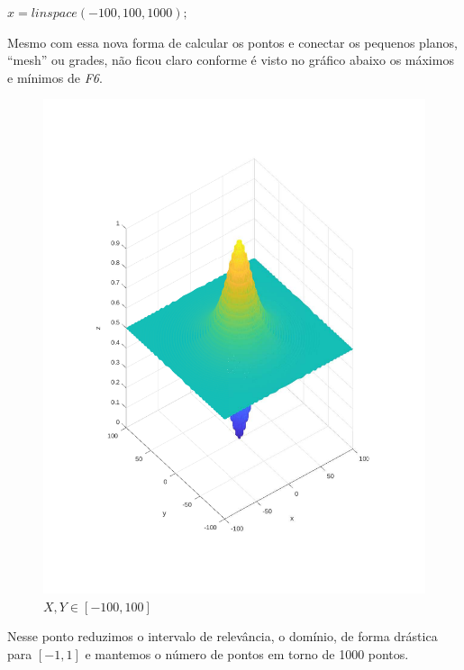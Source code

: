 \documentclass{article}
\begin{document}
$x = linspace(-100, 100, 1000);$



\newpage
\begin{flushleft}
	Mesmo com essa nova forma de calcular os pontos e conectar os
	pequenos planos, ``mesh'' ou grades, não ficou claro conforme é
	visto no gráfico abaixo os máximos e mínimos de \emph{F6}.
\end{flushleft}

\begin{figure}[h!]
\centering
\includegraphics[scale=.5]{images/myplot3.pdf}
\caption{$X,Y \in [-100, 100]$}
\label{fig:plot3_f6}
\end{figure}

\begin{flushleft}
	Nesse ponto reduzimos o intervalo de relevância, o domínio,
	de forma drástica para $[-1,1]$ e mantemos o número de
	pontos em torno de 1000 pontos.
\end{flushleft}
\end{document}
